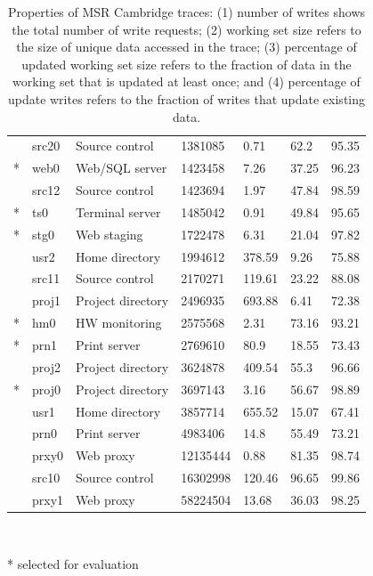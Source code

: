 \begin{table}[t]
\begin{tabular}{L{0.2cm}L{1.2cm}L{2.5cm}P{1.8cm}P{1.9cm}P{1.5cm}P{1.6cm}}
      & src20  & Source control       & 1381085   & 0.71     & 62.2   & 95.35 \\
    * & web0   & Web/SQL server       & 1423458   & 7.26     & 37.25  & 96.23 \\
      & src12  & Source control       & 1423694   & 1.97     & 47.84  & 98.59 \\
    * & ts0    & Terminal server      & 1485042   & 0.91     & 49.84  & 95.65 \\
    * & stg0   & Web staging          & 1722478   & 6.31     & 21.04  & 97.82 \\
      & usr2   & Home directory       & 1994612   & 378.59   & 9.26   & 75.88 \\
      & src11  & Source control       & 2170271   & 119.61   & 23.22  & 88.08 \\
      & proj1  & Project directory  & 2496935   & 693.88   & 6.41   & 72.38 \\
    * & hm0    & HW monitoring        & 2575568   & 2.31     & 73.16  & 93.21 \\
    * & prn1   & Print server         & 2769610   & 80.9     & 18.55  & 73.43 \\
      & proj2  & Project directory    & 3624878   & 409.54   & 55.3   & 96.66 \\
    * & proj0  & Project directory    & 3697143   & 3.16     & 56.67  & 98.89 \\
      & usr1   & Home directory     & 3857714   & 655.52   & 15.07  & 67.41 \\
      & prn0   & Print server         & 4983406   & 14.8     & 55.49  & 73.21 \\
      & prxy0  & Web proxy   & 12135444  & 0.88     & 81.35  & 98.74 \\
      & src10  & Source control       & 16302998  & 120.46   & 96.65  & 99.86 \\
      & prxy1  & Web proxy   & 58224504  & 13.68    & 36.03  & 98.25 \\
    \bottomrule
    \end{tabular}
    \\ \centerline{* selected for evaluation}
	\caption{Properties of MSR Cambridge traces: (1) number of writes
		shows the total number of write requests; (2) working set size refers to
		the size of unique data accessed in the trace; 
		(3) percentage of updated working set
		size refers to the fraction of data in the working set that is updated
		at least once; and (4) percentage of update writes refers to the
		fraction of writes that update existing data.}
\label{table:msr}
\end{table}

